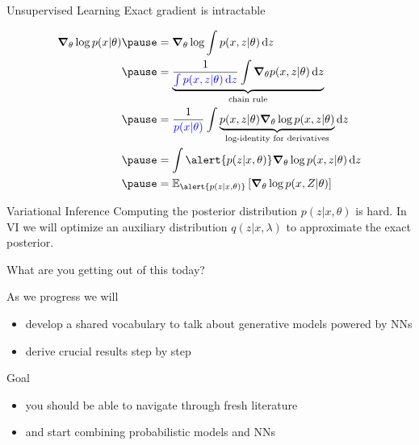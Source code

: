 \documentclass[14pt, aspectratio=169]{beamer}\usepackage[]{graphicx}\usepackage[]{color}
\begin{document}
\begin{frame}{Unsupervised Learning}
Exact gradient is intractable
\begin{small}
\begin{equation*}
\begin{aligned}
\grad_\theta \log p(x|\theta) \pause &= \grad_\theta \log \int p(x, z|\theta) \dd{z} \\ \pause
&= \underbrace{\frac{1}{\textcolor{blue}{\int p(x, z|\theta) \dd{z}}} \int \grad_\theta p(x,z|\theta) \dd{z}}_{\text{chain rule}} \\ \pause
&= \frac{1}{\textcolor{blue}{p(x|\theta)}} \int \underbrace{p(x,z|\theta) \grad_\theta \log p(x,z|\theta)}_{\text{log-identity for derivatives}} \dd{z} \\ \pause
&= \int \alert{p(z|x, \theta)} \grad_\theta \log p(x,z|\theta) \dd{z} \\ \pause
&= \mathbb E_{\alert{p(z|x, \theta)}} \left[ \grad_\theta \log p(x,Z|\theta) \right]
\end{aligned}
\end{equation*}
\end{small}
\end{frame}

\begin{frame}{Variational Inference}
Computing the posterior distribution $ p(z|x, \theta) $ is hard. In VI we will optimize an auxiliary distribution $ q(z|x, \lambda) $ to approximate the exact posterior.
\end{frame}

\begin{frame}{What are you getting out of this today?}

As we progress we will
\begin{itemize}
	\item develop a shared vocabulary to talk about generative models powered by NNs
	\item derive crucial results step by step
\end{itemize}

\pause

Goal
\begin{itemize}
	\item you should be able to navigate through fresh literature
	\item and start combining probabilistic models and NNs
\end{itemize}

\end{frame}
\end{document}
